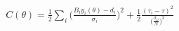 \documentclass[10pt]{article}
\begin{document}
\begin{align*}C(\theta) = \frac{1}{2} \sum_i \Bigg( \frac{B_iy_i(\theta)-d_i}{\sigma_i}\Bigg)^2+\frac{1}{2}\frac{(\tau_i-\tau)^2}{\big(\frac{\sigma_p}{N}\big)^2}\end{align*}
\end{document}
